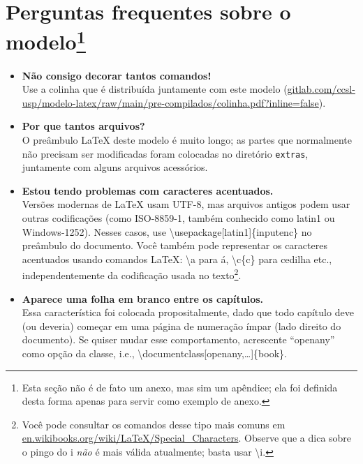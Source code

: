 
\chapter[Perguntas frequentes sobre o modelo]{Perguntas frequentes sobre o modelo\footnote{Esta
seção não é de fato um anexo, mas sim um apêndice; ela foi definida desta
forma apenas para servir como exemplo de anexo.}}

\begin{itemize}

\item \textbf{Não consigo decorar tantos comandos!}\\
Use a colinha que é distribuída juntamente com este modelo (\url{gitlab.com/ccsl-usp/modelo-latex/raw/main/pre-compilados/colinha.pdf?inline=false}).

\item \textbf{Por que tantos arquivos?}\\
O preâmbulo \LaTeX{} deste modelo é muito longo; as partes que normalmente não precisam ser modificadas foram colocadas no diretório \texttt{extras}, juntamente com alguns arquivos acessórios.

\item \textbf{Estou tendo problemas com caracteres acentuados.}\\
Versões modernas de \LaTeX{} usam UTF-8, mas arquivos antigos podem usar outras codificações (como ISO-8859-1, também conhecido como latin1 ou Windows-1252). Nesses casos, use \textsf{\textbackslash{}usepackage[latin1]\{inputenc\}} no preâmbulo do documento. Você também pode representar os caracteres acentuados usando comandos \LaTeX{}: \textsf{\textbackslash\textquotesingle{}a} para á, \textsf{\textbackslash{}c\{c\}} para cedilha etc., independentemente da codificação usada no texto\footnote{Você pode consultar os comandos desse tipo mais comuns em \url{en.wikibooks.org/wiki/LaTeX/Special_Characters}. Observe que a dica sobre o pingo do i \emph{não} é mais válida atualmente; basta usar \textsf{\textbackslash\textquotesingle{}i}.}.

\item \textbf{Aparece uma folha em branco entre os capítulos.}\\
Essa característica foi colocada propositalmente, dado que todo capítulo deve (ou deveria) começar em uma página de numeração ímpar (lado direito do documento). Se quiser mudar esse comportamento, acrescente ``openany'' como opção da classe, i.e., \textsf{\textbackslash{}documentclass[openany,\dots]\{book\}}.


\end{itemize}
